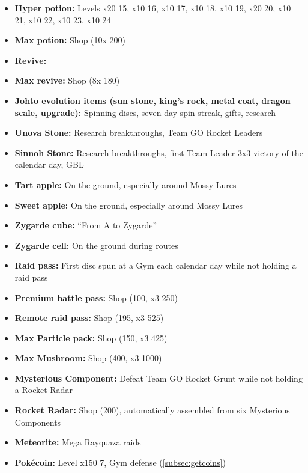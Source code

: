 \begin{itemize}
\item \textbf{Hyper potion:} Levels x20 15, x10 16, x10 17, x10 18, x10 19, x20 20, x10 21, x10 22, x10 23, x10 24
\item \textbf{Max potion:} Shop (10x 200\coin)
\item \textbf{Revive:}
\item \textbf{Max revive:} Shop (8x 180\coin)
\item \textbf{Johto evolution items (sun stone, king's rock, metal coat, dragon scale, upgrade):} Spinning discs, seven day spin streak, gifts, research
\item \textbf{Unova Stone:} Research breakthroughs, Team GO Rocket Leaders
\item \textbf{Sinnoh Stone:} Research breakthroughs, first Team Leader 3x3 victory of the calendar day, GBL
\item \textbf{Tart apple:} On the ground, especially around Mossy Lures
\item \textbf{Sweet apple:} On the ground, especially around Mossy Lures
\item \textbf{Zygarde cube:} ``From A to Zygarde''
\item \textbf{Zygarde cell:} On the ground during routes
\item \textbf{Raid pass:} First disc spun at a Gym each calendar day while not holding a raid pass
\item \textbf{Premium battle pass:} Shop (100\coin, x3 250\coin)
\item \textbf{Remote raid pass:} Shop (195\coin, x3 525\coin)
\item \textbf{Max Particle pack:} Shop (150\coin, x3 425\coin)
\item \textbf{Max Mushroom:} Shop (400\coin, x3 1000\coin)
\item \textbf{Mysterious Component:} Defeat Team GO Rocket Grunt while not holding a Rocket Radar
\item \textbf{Rocket Radar:} Shop (200\coin), automatically assembled from six Mysterious Components
\item \textbf{Meteorite:} Mega Rayquaza raids
\item \textbf{Pokécoin:} Level x150 7, Gym defense (\autoref{subsec:getcoins})
\end{itemize}
